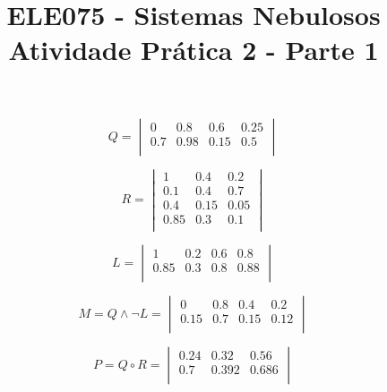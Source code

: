 \documentclass[conference]{IEEEtran}
\begin{document}
\title{ELE075 - Sistemas Nebulosos\\ Atividade Prática 2 - Parte 1
}

\author{
}

\maketitle


\section{}  %

\[
Q = 
\begin{vmatrix}
0 & 0.8 & 0.6 & 0.25 \\
0.7 & 0.98 & 0.15 & 0.5 \\
\end{vmatrix}
\]

\[
R = 
\begin{vmatrix}
1 & 0.4 & 0.2 \\
0.1 & 0.4 & 0.7 \\
0.4 & 0.15 & 0.05 \\
0.85 & 0.3 & 0.1 \\
\end{vmatrix}
\]

\[
L = 
\begin{vmatrix}
1 & 0.2 & 0.6 & 0.8 \\
0.85 & 0.3 & 0.8 & 0.88 \\
\end{vmatrix}
\]

\hfill

\[
M = Q \wedge \neg L = 
\begin{vmatrix}
0 & 0.8 & 0.4 & 0.2 \\
0.15 & 0.7 & 0.15 & 0.12 \\
\end{vmatrix}
\]

\[
P = Q \circ R = 
\begin{vmatrix}
0.24 & 0.32 & 0.56 \\
0.7 & 0.392 & 0.686 \\
\end{vmatrix}
\]
\end{document}
